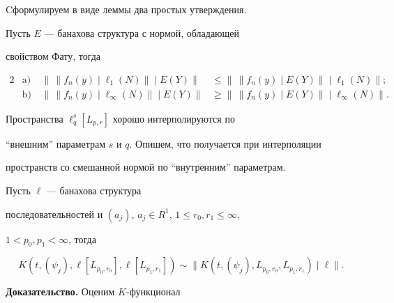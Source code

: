 Cформулируем в виде леммы два простых утверждения.





\begin{lem}


Пусть $E$ --- банахова структура с нормой, обладающей


свойством Фату, тогда


\begin{alignat*}{2}


&{\mathrm a)} &\ \big\| \,\| f_n(y)\mid\ell_1(N) \| \mid E(Y)\big\|


&\le\big \| \, \|f_n(y)\mid E(Y)\| \mid \ell_1(N)\big\| ; \\


%


&{\mathrm b)} &\ \big\| \,\| f_n(y)\mid\ell_{\infty} (N)


\| \mid E(Y)\big\| &\ge \big\| \, \|f_n(y)


\mid E(Y)\| \mid \ell_{\infty } (N)\big\|.


\end{alignat*}


\end{lem}





Пространства $\ell^s_q[L_{p,r}] $ хорошо интерполируются по


``внешним'' параметрам $s$ и $q$. Опишем, что получается при интерполяции


пространств со смешанной нормой по ``внутренним'' параметрам.





\begin{lem}


Пусть $\ell$ --- банахова структура


последовательностей и $(a_j)$, $a_j \in R^1$, $1\le r_0,r_1\le \infty$,


$1<p_0,p_1< \infty$, тогда


$$


K(t,(\psi_j),\ell [L_{p_0,r_0}], \ell[L_{p_1,r_1}]) \sim \|


K(t,(\psi_j), L_{p_0,r_0}, L_{p_1,r_1})\mid\ell \|.


$$


\end{lem}





{\bf Доказательство.} Оценим $K$-функционал


